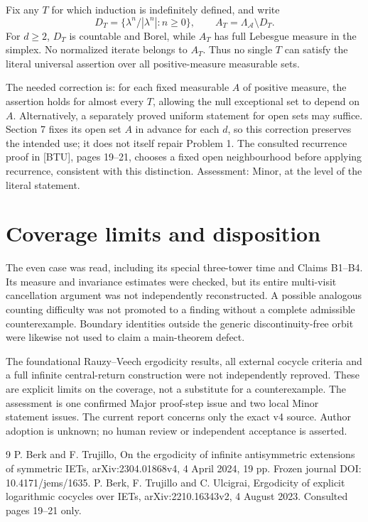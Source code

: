 \documentclass[10pt]{article}
\begin{document}
Fix any \(T\) for which induction is indefinitely defined, and write \[D_T=\{\lambda^n/|\lambda^n|:n\geq0\},\qquad A_T=\Lambda_{\mathcal A}
 \setminus D_T .\] For \(d\geq2\), \(D_T\) is countable and Borel, while \(A_T\) has full Lebesgue measure in the simplex. No normalized iterate belongs to \(A_T\). Thus no single \(T\) can satisfy the literal universal assertion over all positive-measure measurable sets.\par
The needed correction is: for each fixed measurable \(A\) of positive measure, the assertion holds for almost every \(T\), allowing the null exceptional set to depend on \(A\). Alternatively, a separately proved uniform statement for open sets may suffice. Section 7 fixes its open set \(A\) in advance for each \(d\), so this correction preserves the intended use; it does not itself repair Problem 1. The consulted recurrence proof in [BTU], pages 19–21, chooses a fixed open neighbourhood before applying recurrence, consistent with this distinction. Assessment: Minor, at the level of the literal statement.\par
\section*{Coverage limits and disposition}
The even case was read, including its special three-tower time and Claims B1–B4. Its measure and invariance estimates were checked, but its entire multi-visit cancellation argument was not independently reconstructed. A possible analogous counting difficulty was not promoted to a finding without a complete admissible counterexample. Boundary identities outside the generic discontinuity-free orbit were likewise not used to claim a main-theorem defect.\par
The foundational Rauzy–Veech ergodicity results, all external cocycle criteria and a full infinite central-return construction were not independently reproved. These are explicit limits on the coverage, not a substitute for a counterexample. The assessment is one confirmed Major proof-step issue and two local Minor statement issues. The current report concerns only the exact v4 source. Author adoption is unknown; no human review or independent acceptance is asserted.\par
9 P. Berk and F. Trujillo, On the ergodicity of infinite antisymmetric extensions of symmetric IETs, arXiv:2304.01868v4, 4 April 2024, 19 pp. Frozen journal DOI: 10.4171/jems/1635. P. Berk, F. Trujillo and C. Ulcigrai, Ergodicity of explicit logarithmic cocycles over IETs, arXiv:2210.16343v2, 4 August 2023. Consulted pages 19–21 only.\par
\end{document}

